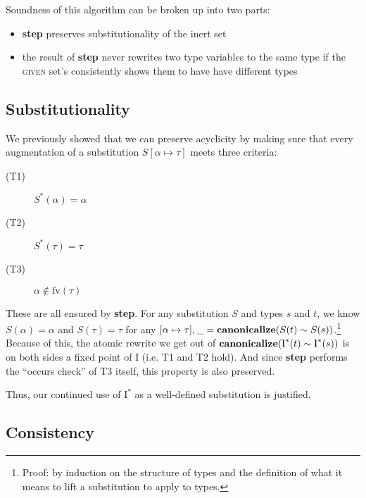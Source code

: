 \documentclass[10pt, letterpaper, oneside]{article}
\newcommand{\inertset}{\text{I}}
\newcommand{\fv}{\mathrm{fv}}
\begin{document}
Soundness of this algorithm can be broken up into two parts:

\begin{itemize}
\item \textbf{step} preserves substitutionality of the inert set
\item the result of \textbf{step} never rewrites two type variables to the same type if the \textsc{given} set's  consistently shows them to have have different types
\end{itemize}

\subsection{Substitutionality}

We previously showed that we can preserve acyclicity by making sure that every augmentation of a substitution \(S[\alpha \mapsto \tau]\) meets three criteria:
\begin{description}
\item[(T1)] \(S^\ast(\alpha) = \alpha\)
\item[(T2)] \(S^\ast(\tau) = \tau\)
\item[(T3)] \(\alpha \notin \fv(\tau)\)
\end{description}
These are all ensured by \textbf{step}. For any substitution \(S\) and types \(s\) and \(t\), we know \(S(\alpha) = \alpha\) and \(S(\tau) = \tau\) for any \([\alpha \mapsto \tau], \_ = \text{\bf canonicalize}(S(t) \sim S(s))\).\footnote{Proof: by induction on the structure of types and the definition of what it means to lift a substitution to apply to types.} Because of this, the atomic rewrite we get out of \(\text{\bf canonicalize}(\inertset^\ast(t) \sim \inertset^\ast(s))\) is on both sides a fixed point of \(\inertset\) (i.e. T1 and T2 hold). And since \textbf{step} performs the ``occurs check'' of T3 itself, this property is also preserved.

Thus, our continued use of \(\inertset^\ast\) as a well-defined substitution is justified.

\subsection{Consistency}



\end{document}
